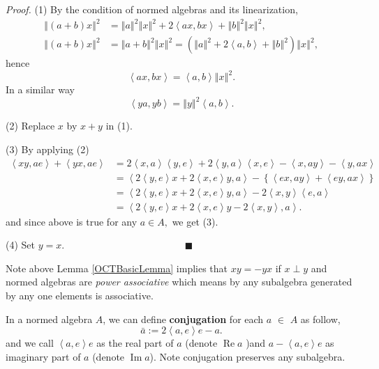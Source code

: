 \documentclass[a4paper]{article}%
\newenvironment{proof}[1][Proof]{\noindent\textit{#1.} }{}
\begin{document}
\begin{proof}
(1) By the condition of normed algebras and its linearization,
\begin{align*}
\left\Vert \left(  a+b\right)  x\right\Vert ^{2}  &  =\left\Vert a\right\Vert
^{2}\left\Vert x\right\Vert ^{2}+2\left\langle ax,bx\right\rangle +\left\Vert
b\right\Vert ^{2}\left\Vert x\right\Vert ^{2},\\
\left\Vert \left(  a+b\right)  x\right\Vert ^{2}  &  =\left\Vert
a+b\right\Vert ^{2}\left\Vert x\right\Vert ^{2}=\left(  \left\Vert
a\right\Vert ^{2}+2\left\langle a,b\right\rangle +\left\Vert b\right\Vert
^{2}\right)  \left\Vert x\right\Vert ^{2},
\end{align*}
hence
\[
\left\langle ax,bx\right\rangle =\left\langle a,b\right\rangle \left\Vert
x\right\Vert ^{2}.
\]
In a similar way
\[
\left\langle ya,yb\right\rangle =\left\Vert y\right\Vert ^{2}\left\langle
a,b\right\rangle .
\]


(2) Replace $x$ by $x+y$ in (1).

(3) By applying (2)%
\begin{align*}
\left\langle xy,ae\right\rangle +\left\langle yx,ae\right\rangle  &
=2\left\langle x,a\right\rangle \left\langle y,e\right\rangle +2\left\langle
y,a\right\rangle \left\langle x,e\right\rangle -\left\langle x,ay\right\rangle
-\left\langle y,ax\right\rangle \\
&  =\left\langle 2\left\langle y,e\right\rangle x+2\left\langle
x,e\right\rangle y,a\right\rangle -\left\{  \left\langle ex,ay\right\rangle
+\left\langle ey,ax\right\rangle \right\} \\
&  =\left\langle 2\left\langle y,e\right\rangle x+2\left\langle
x,e\right\rangle y,a\right\rangle -2\left\langle x,y\right\rangle \left\langle
e,a\right\rangle \\
&  =\left\langle 2\left\langle y,e\right\rangle x+2\left\langle
x,e\right\rangle y-2\left\langle x,y\right\rangle ,a\right\rangle .
\end{align*}
and since above is true for any $a\in A,$ we get (3).

(4) Set $y=x$. \ \ \ \ \ \ \ \ \ \ \ \ \ \ \ \ \ \ \ \ \ \ \ \ $\blacksquare$
\end{proof}

Note above Lemma \ref{OCTBasicLemma} implies that $xy=-yx$ if $x\perp y$ and
normed algebras are \textit{power associative} which means by any subalgebra
generated by any one elements is associative.

In a normed algebra $A$, we can define \textbf{conjugation} for each $a$ $\in$
$A$ as follow,
\[
\bar{a}:=2\left\langle a,e\right\rangle e-a.
\]
and we call $\left\langle a,e\right\rangle e$ as the real part of $a$ (denote
$\operatorname{Re}a$ )and $a-\left\langle a,e\right\rangle e$ as imaginary
part of $a$ (denote $\operatorname{Im}a$). Note conjugation preserves any subalgebra.
\end{document}
